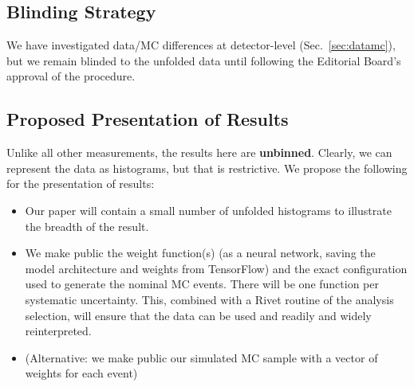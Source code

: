 \subsection{Blinding Strategy}

We have investigated data/MC differences at detector-level (Sec.~\ref{sec:datamc}), but we remain blinded to the unfolded data until following the Editorial Board's approval of the procedure.

\subsection{Proposed Presentation of Results}

Unlike all other measurements, the results here are \textbf{unbinned}.  Clearly, we can represent the data as histograms, but that is restrictive.  We propose the following for the presentation of results:

\begin{itemize}
        \item Our paper will contain a small number of unfolded histograms to illustrate the breadth of the result.
        \item We make public the weight function(s) (as a neural network, saving the model architecture and weights from TensorFlow) and the exact configuration used to generate the nominal MC events.  There will be one function per systematic uncertainty.  This, combined with a Rivet routine of the analysis selection, will ensure that the data can be used and readily and widely reinterpreted.
        \item (Alternative: we make public our simulated MC sample with a vector of weights for each event)
\end{itemize}

